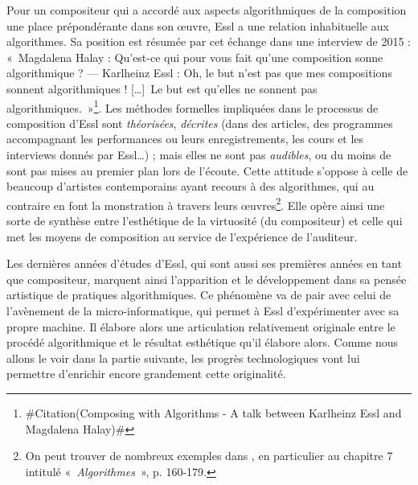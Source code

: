\documentclass[a4paper,12pt]{article}
\newcommand{\guill}[1]{«~#1~»}
\newcommand{\zitat}[2]{\#Citation(#2)\#}
\newcommand{\tpp}[0]{[\dots]}
\begin{document}
Pour un compositeur qui a accordé aux aspects algorithmiques de la composition une place prépondérante dans son œuvre, Essl a une relation inhabituelle aux algorithmes. Sa position est résumée par cet échange dans une interview de 2015 : \guill{Magdalena Halay : Qu'est-ce qui pour vous fait qu'une composition sonne algorithmique ? --- Karlheinz Essl : Oh, le but n'est pas que mes compositions sonnent algorithmiques ! \tpp~Le but est qu'elles ne sonnent pas algorithmiques.}\footnote{\zitat{MH: What makes an algorithmic composition sound algorithmic to you?
KHE: Oh, it's not the point that it sounds algorithmic! Maybe this is a big misunderstanding [laughs]. The point is that it must not sound "algorithmic", you know? [Laughs]}
{Composing with Algorithms - A talk between Karlheinz Essl and Magdalena Halay}}.
Les méthodes formelles impliquées dans le processus de composition d'Essl sont \emph{théorisées}, \emph{décrites} (dans des articles, des programmes accompagnant les performances ou leurs enregistrements, les cours et les interviews donnés par Essl\dots) ; mais elles ne sont pas \emph{audibles}, ou du moins de sont pas mises au premier plan lors de l'écoute. Cette attitude s'oppose à celle de beaucoup d'artistes contemporains ayant recours à des algorithmes, qui au contraire en font la monstration à travers leurs œuvres\footnote{On peut trouver de nombreux exemples dans \cite{wilson2012artscience}, en particulier au chapitre 7 intitulé \guill{\emph{Algorithmes}}, p. 160-179.}. Elle opère ainsi une sorte de synthèse entre l'esthétique de la virtuosité (du compositeur) et celle qui met les moyens de composition au service de l'expérience de l'auditeur.


Les dernières années d'études d'Essl, qui sont aussi ses premières années en tant que compositeur, marquent ainsi l'apparition et le développement dans sa pensée artistique de pratiques algorithmiques. Ce phénomène va de pair avec celui de l'avènement de la micro-informatique, qui permet à Essl d'expérimenter avec sa propre machine. Il élabore alors une articulation relativement originale entre le procédé algorithmique et le résultat esthétique qu'il élabore alors. Comme nous allons le voir dans la partie suivante, les progrès technologiques vont lui permettre d'enrichir encore grandement cette originalité.
\end{document}
